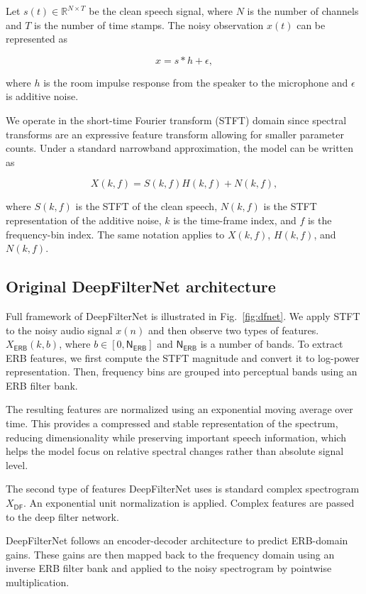 \documentclass[a4paper,12pt]{extarticle}
\begin{document}
Let $s(t) \in \mathbb{R}^{N \times T}$ be the clean speech signal, where $N$ is the number of channels
and $T$ is the number of time stamps. The noisy observation $x(t)$ can be represented as

\[
x = s * h + \epsilon,
\]

where $h$ is the room impulse response from the speaker to the microphone and $\epsilon$ is additive noise.

We operate in the short-time Fourier transform (STFT) domain since spectral transforms are
an expressive feature transform allowing for smaller parameter counts.
Under a standard narrowband approximation, the model can be written as

\[
X(k, f) = S(k, f)H(k, f) + N(k, f),
\]

where $S(k, f)$ is the STFT of the clean speech, $N(k, f)$ is the STFT representation of the additive 
noise, $k$ is the time-frame index, and $f$ is the
frequency-bin index. The same notation applies to $X(k, f)$, $H(k, f)$, and $N(k, f)$.

\subsection{Original DeepFilterNet architecture}

Full framework of DeepFilterNet is illustrated in Fig.~\ref{fig:dfnet}. We apply STFT to the noisy 
audio signal $x(n)$ and then observe two types of features.
$X_{\mathsf{ERB}} (k, b)$, where $b \in [0, \mathsf{N_{ERB}}]$  and $\mathsf{N_{ERB}}$ is a number of bands. 
To extract ERB features, we first compute the STFT magnitude and convert it to log-power representation. 
Then, frequency bins are grouped into perceptual bands using an ERB filter bank.

The resulting features are normalized using an exponential moving average over time. This provides a 
compressed and stable representation of the spectrum, reducing dimensionality while preserving important
speech information, which helps the model focus on relative spectral changes rather than absolute signal level.

The second type of features DeepFilterNet uses is standard complex spectrogram $X_{\mathsf{DF}}$. An exponential unit 
normalization is applied. Complex features are passed to the deep filter network.

DeepFilterNet follows an encoder-decoder architecture to predict ERB-domain gains. These gains are then
mapped back to the frequency domain using an inverse ERB filter bank and applied to the noisy spectrogram
by pointwise multiplication.
\end{document}
